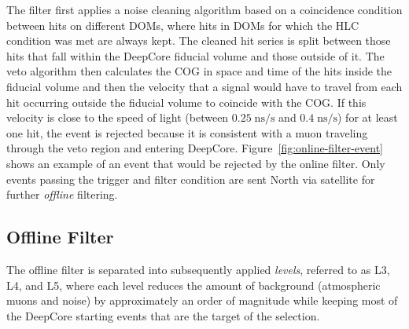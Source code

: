 The filter first applies a noise cleaning algorithm based on a coincidence condition between hits on different DOMs, where hits in DOMs for which the HLC condition was met are always kept. The cleaned hit series is split between those hits that fall within the DeepCore fiducial volume and those outside of it. The veto algorithm then calculates the COG in space and time of the hits inside the fiducial volume and then the velocity that a signal would have to travel from each hit occurring outside the fiducial volume to coincide with the COG. If this velocity is close to the speed of light (between $0.25\;\mathrm{ns/s}$ and $0.4\;\mathrm{ns/s}$) for at least one hit, the event is rejected because it is consistent with a muon traveling through the veto region and entering DeepCore. Figure~\ref{fig:online-filter-event} shows an example of an event that would be rejected by the online filter. Only events passing the trigger and filter condition are sent North via satellite for further \emph{offline} filtering.

\subsection{Offline Filter}

The offline filter is separated into subsequently applied \emph{levels}, referred to as L3, L4, and L5, where each level reduces the amount of background (atmospheric muons and noise) by approximately an order of magnitude while keeping most of the DeepCore starting events that are the target of the selection.

